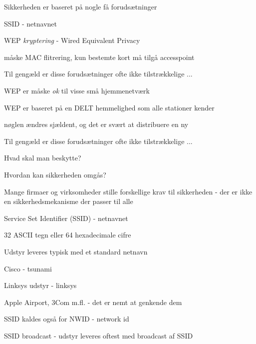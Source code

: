 

\begin{list1}
\item Sikkerheden er baseret på nogle få forudsætninger 
  \begin{list2}
  \item SSID - netnavnet
  \item WEP \emph{kryptering} - Wired Equivalent Privacy
  \item måske MAC flitrering, kun bestemte kort må tilgå accesspoint 
  \end{list2}
\item Til gengæld er disse forudsætninger ofte ikke tilstrækkelige ... 
  \begin{list2}
  \item WEP er måske \emph{ok} til visse små hjemmenetværk
  \item WEP er baseret på en DELT hemmelighed som alle stationer kender
  \item nøglen ændres sjældent, og det er svært at distribuere en ny
  \end{list2}
  
\end{list1}



\begin{list1}
\item Til gengæld er disse forudsætninger ofte ikke tilstrækkelige ... 
\item Hvad skal man beskytte?
\item Hvordan kan sikkerheden omgås?
\item Mange firmaer og virksomheder stille forskellige krav til
  sikkerheden - der er ikke en sikkerhedsmekanisme der passer til alle
\end{list1}


\begin{list1}
\item Service Set Identifier (SSID) - netnavnet
\item 32 ASCII tegn eller 64 hexadecimale cifre
\item Udstyr leveres typisk med et standard netnavn
\begin{list2}
\item Cisco - tsunami
\item Linksys udstyr - linksys
\item Apple Airport, 3Com m.fl. - det er nemt at genkende dem  
\end{list2}
\item SSID kaldes også for NWID - network id
\item SSID broadcast - udstyr leveres oftest med broadcast af SSID
\end{list1}


